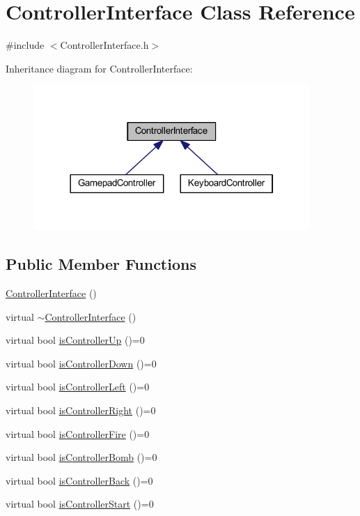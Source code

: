 \hypertarget{class_controller_interface}{
\section{ControllerInterface Class Reference}
\label{de/d7f/class_controller_interface}
}


{\ttfamily \#include $<$ControllerInterface.h$>$}



Inheritance diagram for ControllerInterface:
\nopagebreak
\begin{figure}[H]
\begin{center}
\leavevmode
\includegraphics[width=297pt]{d2/d9e/class_controller_interface__inherit__graph}
\end{center}
\end{figure}
\subsection*{Public Member Functions}
\begin{DoxyCompactItemize}
\item 
\hyperlink{class_controller_interface_a6b0780664561bf69af0f12f6bbed5602}{ControllerInterface} ()
\item 
virtual \hyperlink{class_controller_interface_ade06ff8cd039030c8b0dffa7b543f8f4}{$\sim$ControllerInterface} ()
\item 
virtual bool \hyperlink{class_controller_interface_a1a139422246c70afd79c9c575643da9e}{isControllerUp} ()=0
\item 
virtual bool \hyperlink{class_controller_interface_aab99aa7e15178e81aec724648be7039e}{isControllerDown} ()=0
\item 
virtual bool \hyperlink{class_controller_interface_a145bb4c3c50672bee5bc83db57099aa3}{isControllerLeft} ()=0
\item 
virtual bool \hyperlink{class_controller_interface_ab4a13d332fc323a5db76be9af054b781}{isControllerRight} ()=0
\item 
virtual bool \hyperlink{class_controller_interface_aac960ad36a741e4f05651fbfd020f0d1}{isControllerFire} ()=0
\item 
virtual bool \hyperlink{class_controller_interface_a8f63bccb0547500f0e27451890400dc5}{isControllerBomb} ()=0
\item 
virtual bool \hyperlink{class_controller_interface_a159f05315dcb80cf0729e80454072228}{isControllerBack} ()=0
\item 
virtual bool \hyperlink{class_controller_interface_a4fb10447e2ea63eb48565a91e8936e6e}{isControllerStart} ()=0
\end{DoxyCompactItemize}


